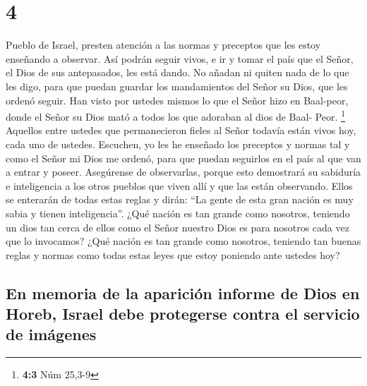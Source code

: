 \hypertarget{section-3}{%
\section{4}\label{section-3}}

 Pueblo de Israel, presten atención a las normas y
preceptos que les estoy enseñando a observar. Así podrán seguir vivos, e
ir y tomar el país que el Señor, el Dios de sus antepasados, les está
dando.  No añadan ni quiten nada de lo que les digo, para
que puedan guardar los mandamientos del Señor su Dios, que les ordenó
seguir.  Han visto por ustedes mismos lo que el Señor hizo
en Baal-peor, donde el Señor su Dios mató a todos los que adoraban al
dios de Baal- Peor. \footnote{\textbf{4:3} Núm 25,3-9} 
Aquellos entre ustedes que permanecieron fieles al Señor todavía están
vivos hoy, cada uno de ustedes.  Escuchen, yo les he
enseñado los preceptos y normas tal y como el Señor mi Dios me ordenó,
para que puedan seguirlos en el país al que van a entrar y poseer.
 Asegúrense de observarlas, porque esto demostrará su
sabiduría e inteligencia a los otros pueblos que viven allí y que las
están observando. Ellos se enterarán de todas estas reglas y dirán: ``La
gente de esta gran nación es muy sabia y tienen inteligencia''.
 ¿Qué nación es tan grande como nosotros, teniendo un dios
tan cerca de ellos como el Señor nuestro Dios es para nosotros cada vez
que lo invocamos?  ¿Qué nación es tan grande como
nosotros, teniendo tan buenas reglas y normas como todas estas leyes que
estoy poniendo ante ustedes hoy?

\hypertarget{en-memoria-de-la-apariciuxf3n-informe-de-dios-en-horeb-israel-debe-protegerse-contra-el-servicio-de-imuxe1genes}{%
\subsection{En memoria de la aparición informe de Dios en Horeb, Israel
debe protegerse contra el servicio de
imágenes}\label{en-memoria-de-la-apariciuxf3n-informe-de-dios-en-horeb-israel-debe-protegerse-contra-el-servicio-de-imuxe1genes}}

